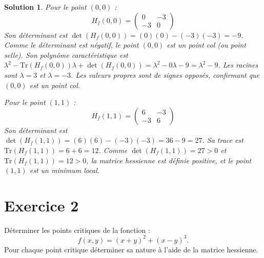 \documentclass{article}
\newtheorem{solution}{Solution}
\begin{document}
\begin{solution}
Pour le point $(0,0)$ :
\[ H_f(0,0) = \begin{pmatrix} 0 & -3 \\ -3 & 0 \end{pmatrix} \]
Son déterminant est $\det(H_f(0,0)) = (0)(0) - (-3)(-3) = -9$.
Comme le déterminant est négatif, le point $(0,0)$ est un point col (ou point selle).
Son polynôme caractéristique est $\lambda^2 - \text{Tr}(H_f(0,0))\lambda + \det(H_f(0,0)) = \lambda^2 - 0\lambda - 9 = \lambda^2 - 9$. Les racines sont $\lambda = 3$ et $\lambda = -3$. Les valeurs propres sont de signes opposés, confirmant que $(0,0)$ est un point col.

Pour le point $(1,1)$ :
\[ H_f(1,1) = \begin{pmatrix} 6 & -3 \\ -3 & 6 \end{pmatrix} \]
Son déterminant est $\det(H_f(1,1)) = (6)(6) - (-3)(-3) = 36 - 9 = 27$.
Sa trace est $\text{Tr}(H_f(1,1)) = 6 + 6 = 12$.
Comme $\det(H_f(1,1)) = 27 > 0$ et $\text{Tr}(H_f(1,1)) = 12 > 0$, la matrice hessienne est définie positive, et le point $(1,1)$ est un minimum local.

\end{solution}

\section{Exercice 2}
Déterminer les points critiques de la fonction :
\[f(x,y) = (x + y)^2 + (x - y)^3.\]
Pour chaque point critique déterminer sa nature à l'aide de la matrice hessienne.
\end{document}
